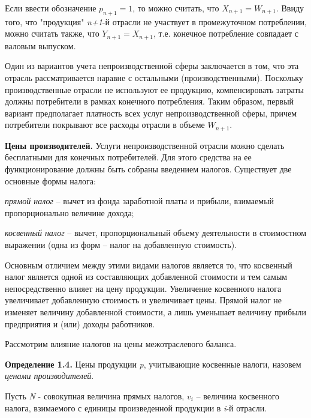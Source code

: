 \documentclass[12pt, 4paper]{book}
\begin{document}
{Если ввести обозначение $ p_{n+1} = 1 $, то можно считать, что $ X_{n+1} = W_{n+1} $. Ввиду того, что "продукция" \textit{n+1}-й отрасли не участвует в промежуточном потреблении, можно считать также, что $ Y_{n+1} = X_{n+1} $, т.е. конечное потребление совпадает с валовым выпуском.
\par
\hspace{0.5cm}
Один из вариантов учета непроизводственной сферы заключается в том, что эта отрасль рассматривается наравне с остальными (производственными). Поскольку производственные отрасли не используют ее продукцию, компенсировать затраты должны потребители в рамках конечного потребления. Таким образом, первый вариант предполагает платность всех услуг непроизводственной сферы, причем потребители покрывают все расходы отрасли в объеме 
$W_{n+1}$.
\par
\hspace{0.5cm}
\textbf{Цены производителей.} Услуги непроизводственной отрасли можно сделать бесплатными для конечных потребителей. Для этого средства на ее функционирование должны быть собраны введением налогов.
Существует две основные формы налога:
\par
\hspace{0.5cm}
\textit{прямой налог} – вычет из фонда заработной платы и прибыли, взимаемый пропорционально величине дохода;
\par
\hspace{0.5cm}
\textit{косвенный налог} – вычет, пропорциональный объему деятельности в стоимостном выражении (одна из форм – налог на добавленную стоимость).
\par
\hspace{0.5cm}
Основным отличием между этими видами налогов является то, что косвенный налог является одной из составляющих добавленной стоимости и тем самым непосредственно влияет на цену продукции. Увеличение косвенного налога увеличивает добавленную стоимость и увеличивает цены. Прямой налог не изменяет величину добавленной стоимости, а лишь уменьшает величину прибыли предприятия и (или) доходы работников.
\par
\hspace{0.5cm}
Рассмотрим влияние налогов на цены межотраслевого баланса.
\par
\hspace{0.5cm}
\textbf{Определение 1.4.} Цены продукции \textit{p}, учитывающие косвенные налоги, назовем \textit{ценами производителей}.
\par
\hspace{0.5cm}
Пусть \textit{N} - совокупная величина прямых налогов, $v_i$ – величина косвенного налога, взимаемого с единицы произведенной продукции в \textit{i}-й отрасли.
}
\end{document}
